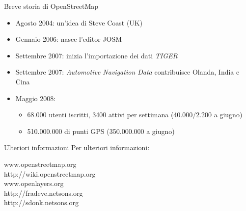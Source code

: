 \documentclass[slidestop,compress,red,notes,xcolor=dvipsnames]{beamer}	%
\begin{document}
        \begin{frame}{Breve storia di OpenStreetMap}
            \begin{itemize}
                \item Agosto 2004: un'idea di Steve Coast (UK)
                \pause \item Gennaio 2006: nasce l'editor JOSM
                \pause \item Settembre 2007: inizia l'importazione dei dati \textit{TIGER}
                \pause \item Settembre 2007: \textit{Automotive Navigation Data} contribuisce Olanda, India e Cina
                \pause \item Maggio 2008:
                \begin{itemize}
                    \item 68.000 utenti iscritti, 3400 attivi per settimana (40.000/2.200 a giugno)
                    \item 510.000.000 di punti GPS (350.000.000 a giugno)
                \end{itemize}
            \end{itemize}
        \end{frame}

        \begin{frame}{Ulteriori informazioni}
            Per ulteriori informazioni:
            \begin{Large}
                \begin{center}
                    www.openstreetmap.org\\
                    http://wiki.openstreetmap.org\vspace{1cm}\\
                    www.openlayers.org\\
                    http://fradeve.netsons.org\\
                    http://sdonk.netsons.org\\
                \end{center}
            \end{Large}
        \end{frame}
\end{document}

